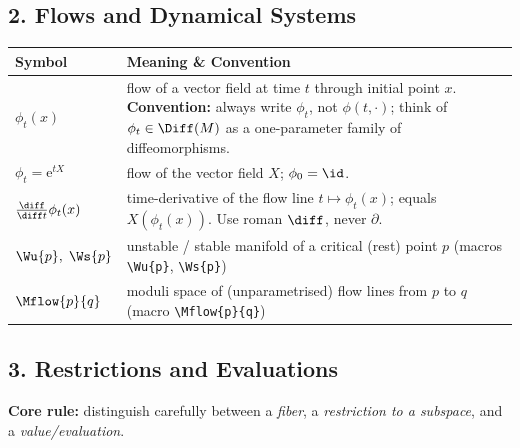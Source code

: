 \subsection*{2. Flows and Dynamical Systems}

\begin{longtable}{@{} p{4cm} p{10cm} @{}}
	\toprule
	\textbf{Symbol} & \textbf{Meaning \& Convention} \\
	\midrule
	\endhead
	
	$\phi_t(x)$
	& flow of a vector field at time $t$ through initial point $x$.
	\textbf{Convention:} always write $\phi_t$, not $\phi(t,\cdot)$;
	think of $\phi_t\in\Diff(M)$ as a one-parameter family of
	diffeomorphisms.\\[4pt]
	
	$\phi_t = \mathrm{e}^{t X}$
	& flow of the vector field $X$; $\phi_0 = \id$. \\[4pt]
	
	$\frac{\diff}{\diff t}\phi_t(x)$
	& time-derivative of the flow line $t\mapsto\phi_t(x)$;
	equals $X(\phi_t(x))$. Use roman $\diff$, never $\partial$. \\[4pt]
	
	$\Wu{p},\;\Ws{p}$
	& unstable / stable manifold of a critical (rest) point $p$
	(macros \texttt{\textbackslash Wu\{p\}}, \texttt{\textbackslash Ws\{p\}}) \\[4pt]
	
	$\Mflow{p}{q}$
	& moduli space of (unparametrised) flow lines from $p$ to $q$
	(macro \texttt{\textbackslash Mflow\{p\}\{q\}}) \\[4pt]
	
	\bottomrule
\end{longtable}

\subsection*{3. Restrictions and Evaluations}

\medskip\noindent
\textbf{Core rule:} distinguish carefully between a \emph{fiber},
a \emph{restriction to a subspace}, and a \emph{value/evaluation}.


